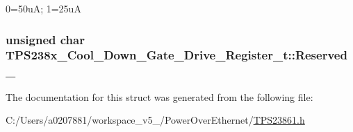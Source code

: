 0=50u\-A; 1=25u\-A 

\hypertarget{struct_t_p_s238x___cool___down___gate___drive___register__t_ae9f0d451d6ad80a30efbf93d1e2d0a24}{
\subsubsection[{Reserved\-\_\-20}]{\setlength{\rightskip}{0pt plus 5cm}unsigned char T\-P\-S238x\-\_\-\-Cool\-\_\-\-Down\-\_\-\-Gate\-\_\-\-Drive\-\_\-\-Register\-\_\-t\-::\-Reserved\-\_}}\label{struct_t_p_s238x___cool___down___gate___drive___register__t_ae9f0d451d6ad80a30efbf93d1e2d0a24}


The documentation for this struct was generated from the following file\-:\begin{DoxyCompactItemize}
\item 
C\-:/\-Users/a0207881/workspace\-\_\-v5\-\_/\-Power\-Over\-Ethernet/\hyperlink{_t_p_s23861_8h}{T\-P\-S23861.\-h}\end{DoxyCompactItemize}
